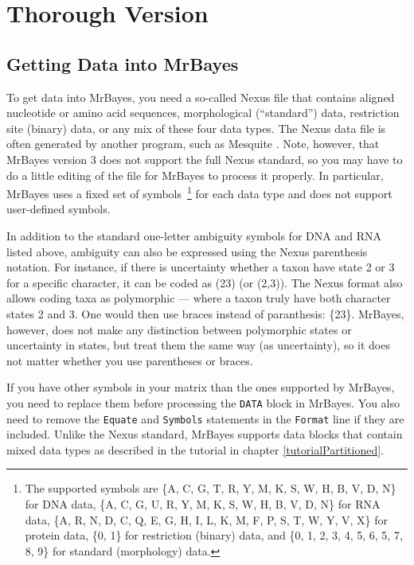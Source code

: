 \documentclass[12pt]{book}
\begin{document}
\section{Thorough Version}

\subsection{Getting Data into MrBayes}

To get data into MrBayes, you need a so-called Nexus file that contains aligned nucleotide or amino
acid sequences, morphological (``standard'') data, restriction site (binary) data, or any mix of
these four data types. The Nexus data file is often generated by another program, such as Mesquite
\citep{maddison06}. Note, however, that MrBayes version 3 does not support the full Nexus standard,
so you may have to do a little editing of the file for MrBayes to process it properly. In
particular, MrBayes uses a fixed set of symbols~\footnote{The supported symbols are \{A, C, G, T,
R, Y, M, K, S, W, H, B, V, D, N\} for DNA data, \{A, C, G, U, R, Y, M, K, S, W, H, B, V, D, N\} for
RNA data, \{A, R, N, D, C, Q, E, G, H, I, L, K, M, F, P, S, T, W, Y, V, X\} for protein data, \{0,
1\} for restriction (binary) data, and \{0, 1, 2, 3, 4, 5, 6, 5, 7, 8, 9\} for standard
(morphology) data.} for each data type and does not support user-defined symbols. 

In addition to the standard one-letter ambiguity symbols for DNA and RNA listed above, ambiguity
can also be expressed using the Nexus parenthesis notation. For instance, if there is uncertainty
whether a taxon have state 2 or 3 for a specific character, it can be coded as (23) (or (2,3)).
The Nexus format also allows coding taxa as polymorphic --- where a taxon truly have both character
states 2 and 3. One would then use braces instead of paranthesis: \{23\}. MrBayes, however, does
not make any distinction between polymorphic states or uncertainty in states, but treat them the
same way (as uncertainty), so it does not matter whether you use parentheses or braces.

If you have other symbols in your matrix than the ones supported by MrBayes, you need to replace
them before processing the \texttt{DATA} block in MrBayes. You also need to remove the
\texttt{Equate} and \texttt{Symbols} statements in the \texttt{Format} line if they are included.
Unlike the Nexus standard, MrBayes supports data blocks that contain mixed data types as described
in the tutorial in chapter \ref{tutorialPartitioned}.
\end{document}
